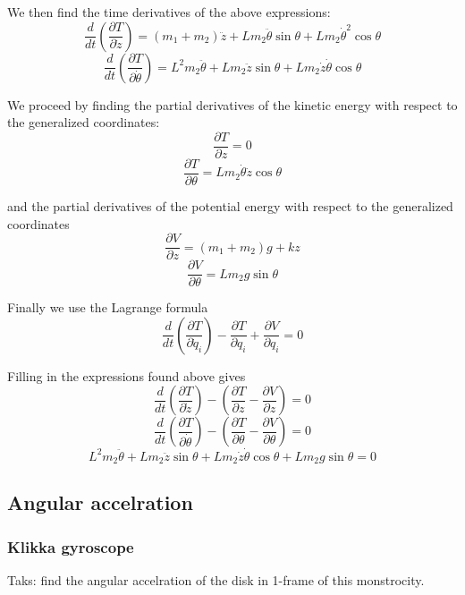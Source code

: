 We then find the time derivatives of the above expressions:
\[
\frac{d}{dt} \left( \frac{\partial T}{\partial \dot{z}} \right) = (m_1 + m_2) \ddot{z} + L m_2 \ddot{\theta} \sin \theta + L m_2 \dot{\theta}^2 \cos \theta
\]
\[
\frac{d}{dt} \left( \frac{\partial T}{\partial \dot{\theta}} \right) = L^2 m_2 \ddot{\theta} + L m_2 \ddot{z} \sin \theta + L m_2 \dot{z} \dot{\theta} \cos \theta
\]

We proceed by finding the partial derivatives of the kinetic energy with respect to the generalized coordinates:
\[
\frac{\partial T}{\partial z} = 0
\]
\[
\frac{\partial T}{\partial \theta} = L m_2 \dot{\theta} \dot{z} \cos \theta
\]

and the partial derivatives of the potential energy with respect to the generalized coordinates
\[
\frac{\partial V}{\partial z} = (m_1 + m_2) g + k z
\]
\[
\frac{\partial V}{\partial \theta} = L m_2 g \sin \theta
\]

Finally we use the Lagrange formula
\[
\frac{d}{dt} \left( \frac{\partial T}{\partial \dot{q}_i} \right) - \frac{\partial T}{\partial q_i} + \frac{\partial V}{\partial q_i} = 0
\]

Filling in the expressions found above gives
\[
\frac{d}{dt} \left( \frac{\partial T}{\partial \dot{z}} \right) - \left( \frac{\partial T}{\partial z} - \frac{\partial V}{\partial z} \right) = 0
\]
\[
\frac{d}{dt} \left( \frac{\partial T}{\partial \dot{\theta}} \right) - \left( \frac{\partial T}{\partial \theta} - \frac{\partial V}{\partial \theta} \right) = 0
\]
\[
L^2 m_2 \ddot{\theta} + L m_2 \ddot{z} \sin \theta + L m_2 \dot{z} \dot{\theta} \cos \theta + L m_2 g \sin \theta = 0
\]




\subsection{Angular accelration}

\subsubsection{Klikka gyroscope}
Taks: find the angular accelration of the disk in 1-frame of this monstrocity.

